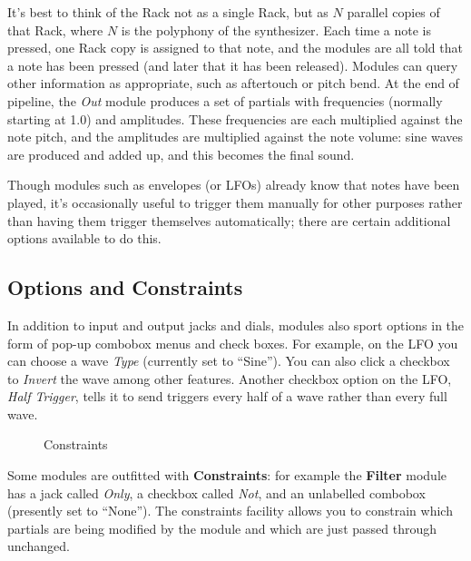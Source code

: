 \documentclass{article}
\begin{document}
It's best to think of the Rack not as a single Rack, but as \(N\) parallel copies of that Rack, where \(N\) is the polyphony of the synthesizer.  Each time a note is pressed, one Rack copy is assigned to that note, and the modules are all told that a note has been pressed (and later that it has been released).  Modules can query other information as appropriate, such as aftertouch or pitch bend.  At the end of pipeline, the {\it Out} module produces a set of partials with frequencies (normally starting at 1.0) and amplitudes.  These frequencies are each multiplied against the note pitch, and the amplitudes are multiplied against the note volume: sine waves are produced and added up, and this becomes the final sound.

Though modules such as envelopes (or LFOs) already know that notes have been played, it's occasionally useful to trigger them manually for other purposes rather than having them trigger themselves automatically; there are certain additional options available to do this.

\subsection{Options and Constraints}


In addition to input and output jacks and dials, modules also sport options in the form of pop-up combobox menus and check boxes.  For example, on the LFO you can choose a wave {\it Type} (currently set to ``Sine'').  You can also click a checkbox to {\it Invert} the wave among other features.  Another checkbox option on the LFO, {\it Half Trigger}, tells it to send triggers every half of a wave rather than every full wave.

\begin{figure}
\vspace{-2em}
\caption{Constraints}
\vspace{-1em}
\label{constraintfacility}
\end{figure}

Some modules are outfitted with {\bf Constraints}: for example the {\bf Filter} module has a jack called {\it Only}, a checkbox called {\it Not}, and an unlabelled combobox (presently set to ``None'').  The constraints facility allows you to constrain which partials are being modified by the module and which are just passed through unchanged. 
\end{document}
